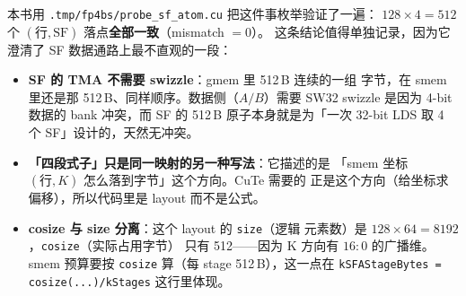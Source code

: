 本书用 \texttt{.tmp/\allowbreak fp4bs/\allowbreak probe\_sf\_atom.cu} 把这件事枚举验证了一遍：
$128\times4 = 512$ 个 $(\text{行}, \mathrm{SF})$ 落点\textbf{全部一致}（mismatch $=0$）。
这条结论值得单独记录，因为它澄清了 SF 数据通路上最不直观的一段：

\begin{itemize}[itemsep=2pt,topsep=3pt]
  \item \textbf{SF 的 TMA 不需要 swizzle}：gmem 里 512\,B 连续的一组
        字节，在 smem 里还是那 512\,B、同样顺序。数据侧（$A/B$）需要
        SW32 swizzle 是因为 4-bit 数据的 bank 冲突，而 SF 的 512\,B
        原子本身就是为「一次 32-bit LDS 取 4 个 SF」设计的，天然无冲突。
  \item \textbf{「四段式子」只是同一映射的另一种写法}：它描述的是
        「smem 坐标 $(\text{行}, K)$ 怎么落到字节」这个方向。CuTe 需要的
        正是这个方向（给坐标求偏移），所以代码里是 layout 而不是公式。
  \item \textbf{cosize 与 size 分离}：这个 layout 的 \texttt{size}（逻辑
        元素数）是 $128\times64 = 8192$，\texttt{cosize}（实际占用字节）
        只有 512——因为 K 方向有 $16{:}0$ 的广播维。smem 预算要按
        \texttt{cosize} 算（每 stage 512\,B），这一点在
        \texttt{kSFAStageBytes = cosize(...)/\allowbreak kStages} 这行里体现。
\end{itemize}

